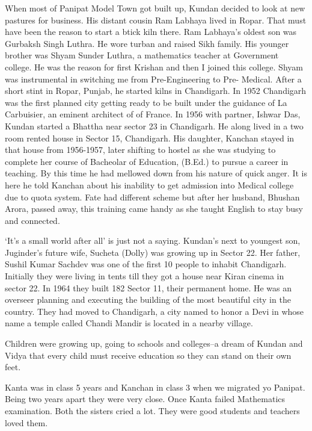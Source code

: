 When most of Panipat Model Town got built up, Kundan decided to look at new pastures for business. His distant cousin Ram Labhaya lived in Ropar. That must have been the reason to start a btick kiln there. Ram Labhaya’s oldest son was Gurbaksh Singh Luthra. He wore turban and raised Sikh family. His younger brother was Shyam Sunder Luthra, a mathematics teacher at Government college. He was the reason for first Krishan and then I joined this college. Shyam was instrumental in switching me from Pre-Engineering to Pre- Medical. After a short stint in Ropar, Punjab, he started kilns in Chandigarh. In 1952 Chandigarh was the first planned city getting ready to be built under the guidance of La Carbuisier, an eminent architect of  of France. In 1956 with partner, Ishwar Das, Kundan started a Bhattha near sector 23 in Chandigarh. He along lived in a two room rented house in Sector 15, Chandigarh. His daughter, Kanchan stayed in that house from 1956-1957, later shifting to hostel as she was studying to complete her course of Bacheolar of Education, (B.Ed.) to pursue a career in teaching. By this time he had mellowed down from his nature of quick anger. It is here he told Kanchan about his inability to get admission into Medical college due to quota system. Fate had different scheme but after her husband, Bhushan Arora, passed away, this training came handy as she taught English to stay busy and connected.

 ‘It's  a small world after all’ is just not a saying. Kundan's next to youngest son, Juginder's future wife, Sucheta (Dolly) was growing up in Sector 22. Her father, Sushil Kumar Sachdev was one of the first 10 people to inhabit Chandigarh. Initially they were living in tents till they got a house near Kiran cinema in sector 22. In 1964 they built 182 Sector 11, their permanent home. He was an overseer planning and executing the building of the most beautiful city in the country. They had moved to Chandigarh, a city named to honor a Devi in whose name a temple called Chandi Mandir is located in a nearby village. 

Children were growing up, going to schools and colleges--a dream of Kundan and Vidya that every child must receive education so they can stand on their own feet. 

Kanta was in class 5 years and Kanchan in class 3 when we migrated yo Panipat. Being two years apart they were very close. Once Kanta failed Mathematics examination. Both the sisters cried a lot. They were good students and teachers loved them. 

